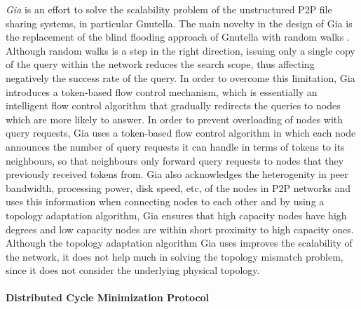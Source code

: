 \documentclass[acmcsur,acmnow]{acmtrans2m}
\begin{document}
\emph{Gia} \cite{chawathe_gia_2003} is an effort to solve the scalability
problem of the unstructured P2P file sharing systems, in particular Gnutella.
The main novelty in the design of Gia is the replacement of the blind flooding
approach of Gnutella with random walks \cite{lv_randomwalks_2002}. Although
random walks is a step in the right direction, issuing only a single copy of the
query within the network reduces the search scope, thus affecting negatively the success rate
of the query.  In order to overcome this limitation, Gia introduces a
token-based flow control mechanism, which is essentially an intelligent flow
control algorithm that gradually redirects the queries to nodes which are more likely to answer. In order to prevent overloading of nodes with query requests, Gia uses a token-based flow control algorithm in which each node announces the number of query requests it
can handle in terms of tokens to its neighbours, so that neighbours only forward
query requests to nodes that they previously received tokens from. Gia also acknowledges the heterogenity in peer bandwidth,
processing power, disk speed, etc, of the nodes in P2P networks and uses this
information when connecting nodes to each other and by using a topology
adaptation algorithm, Gia ensures that high capacity nodes have high degrees and
low capacity nodes are within short proximity to high capacity ones. Although the
topology adaptation algorithm Gia uses improves the scalability of the network,
it does not help much in solving the topology mismatch problem, since it does
not consider the underlying physical topology.

\paragraph*{\bf Distributed Cycle Minimization Protocol}
\end{document}
